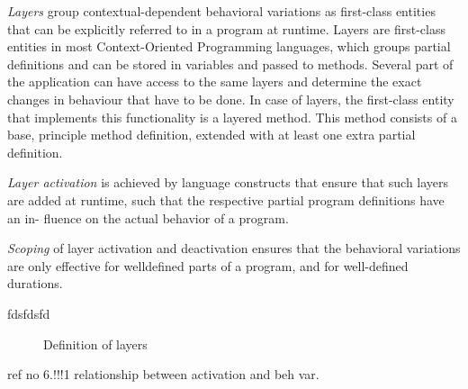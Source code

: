 \documentclass{acm_proc_article-sp}
\begin{document}
\textit{Layers} group contextual-dependent behavioral variations as first-class entities that can be explicitly referred to in a program at runtime. Layers are first-class entities in most Context-Oriented Programming languages, which groups partial definitions and can be stored in variables and passed to methods. Several part of the application can have access to the same layers and determine the exact changes in behaviour that have to be done. In case of layers, the first-class entity that implements this functionality is a layered method. This method consists of a base, principle method definition, extended with at least one extra partial definition.

\textit{Layer activation} is achieved by language constructs that
ensure that such layers are added at runtime, such that
the respective partial program definitions have an in-
fluence on the actual behavior of a program.

\textit{Scoping} of layer activation and deactivation ensures that
the behavioral variations are only effective for welldefined
parts of a program, and for well-defined durations.

fdsfdsfd
 
\begin{figure}[H]
\centering
{}
\caption{Definition of layers}
\end{figure}

ref no 6.!!!1 relationship between activation and beh var.




\end{document}
